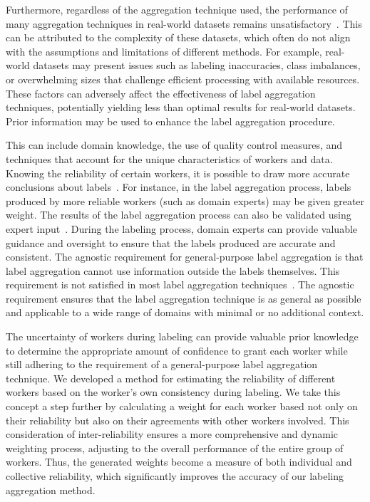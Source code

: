 \documentclass[sn-nature]{bst/sn-jnl}
\begin{document}
Furthermore, regardless of the aggregation technique used, the performance of many aggregation techniques in real-world datasets remains unsatisfactory~\cite{liu_Exploiting_2021}. This can be attributed to the complexity of these datasets, which often do not align with the assumptions and limitations of different methods. For example, real-world datasets may present issues such as labeling inaccuracies, class imbalances, or overwhelming sizes that challenge efficient processing with available resources. These factors can adversely affect the effectiveness of label aggregation techniques, potentially yielding less than optimal results for real-world datasets.
Prior information may be used to enhance the label aggregation procedure.

This can include domain knowledge, the use of quality control measures, and techniques that account for the unique characteristics of workers and data. Knowing the reliability of certain workers, it is possible to draw more accurate conclusions about labels~\cite{li_Crowdsourced_2017}. For instance, in the label aggregation process, labels produced by more reliable workers (such as domain experts) may be given greater weight. The results of the label aggregation process can also be validated using expert input~\cite{liu_Improving_2017}. During the labeling process, domain experts can provide valuable guidance and oversight to ensure that the labels produced are accurate and consistent.
The agnostic requirement for general-purpose label aggregation is that label aggregation cannot use information outside the labels themselves. This requirement is not satisfied in most label aggregation techniques~\cite{zhang_Crowdsourced_2019}. The agnostic requirement ensures that the label aggregation technique is as general as possible and applicable to a wide range of domains with minimal or no additional context.

The uncertainty of workers during labeling can provide valuable prior knowledge to determine the appropriate amount of confidence to grant each worker while still adhering to the requirement of a general-purpose label aggregation technique. We developed a method for estimating the reliability of different workers based on the worker's own consistency during labeling. We take this concept a step further by calculating a weight for each worker based not only on their reliability but also on their agreements with other workers involved. This consideration of inter-reliability ensures a more comprehensive and dynamic weighting process, adjusting to the overall performance of the entire group of workers. Thus, the generated weights become a measure of both individual and collective reliability, which significantly improves the accuracy of our labeling aggregation method.
\end{document}
